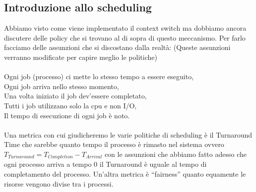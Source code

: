 \documentclass{article}
\begin{document}
\subsection{Introduzione allo scheduling}
Abbiamo visto come viene implementato il context switch ma dobbiamo ancora discutere delle policy che si trovano al di sopra di questo meccanismo. Per farlo facciamo delle assunzioni che si discostano dalla realtà: (Queste assunzioni verranno modificate per capire meglio le politiche)\\\\
Ogni job (processo) ci mette lo stesso tempo a essere eseguito, \\
Ogni job arriva nello stesso momento,\\
Una volta iniziato il job dev’essere completato,\\
Tutti i job utilizzano solo la cpu e non I/O,\\
Il tempo di esecuzione di ogni job è noto.\\ \\
Una metrica con cui giudicheremo le varie politiche di scheduling è il Turnaround Time che sarebbe quanto tempo il processo è rimasto nel sistema ovvero \( T_{Turnaround}=T_{Completion}-T_{Arrival} \) con le assunzioni che abbiamo fatto adesso che ogni processo arriva a tempo 0 il Turnaround è uguale al tempo di completamento del processo. Un’altra metrica è “fairness” quanto equamente le risorse vengono divise tra i processi.
\end{document}

